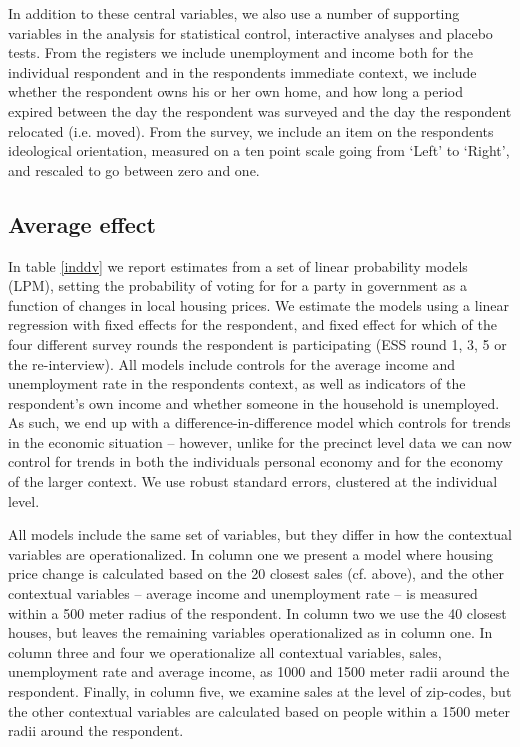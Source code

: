 \documentclass[12pt,a4paper]{article}
\begin{document}
In addition to these central variables, we also use a number of supporting variables in the analysis for statistical control, interactive analyses and placebo tests. From the registers we include unemployment and income both for the individual respondent and in the respondents immediate context, we include whether the respondent owns his or her own home, and how long a period expired between the day the respondent was surveyed and the day the respondent relocated (i.e. moved). From the survey, we include an item on the respondents ideological orientation, measured on a ten point scale going from `Left' to `Right', and rescaled to go between zero and one.

\subsection{Average effect}
In table \ref{inddv}  we report estimates from a set of linear probability models (LPM), setting the probability of voting for for a party in government as a function of changes in local housing prices. We estimate the models using a linear regression with fixed effects for the respondent, and fixed effect for which of the four different survey rounds the respondent is participating  (ESS round 1, 3, 5 or the re-interview). All models include controls for the average income and unemployment rate in the respondents context, as well as indicators of the respondent's own income and whether someone in the household is unemployed. As such, we end up with a difference-in-difference model which controls for trends in the economic situation -- however, unlike for the precinct level data we can now control for trends in both the individuals personal economy and for the economy of the larger context. We use robust standard errors, clustered at the individual level.

All models include the same set of variables, but they differ in how the contextual variables are operationalized. In column one we present a model where housing price change is calculated based on the 20 closest sales (cf. above), and the other contextual variables -- average income and unemployment rate -- is measured within a 500 meter radius of the respondent. In column two we use the 40 closest houses, but leaves the remaining variables operationalized as in column one. In column three and four we operationalize all contextual variables, sales, unemployment rate and average income, as 1000 and 1500 meter radii around the respondent. Finally, in column five, we examine sales at the level of zip-codes, but the other contextual variables are calculated based on people within a 1500 meter radii around the respondent.
\end{document}
